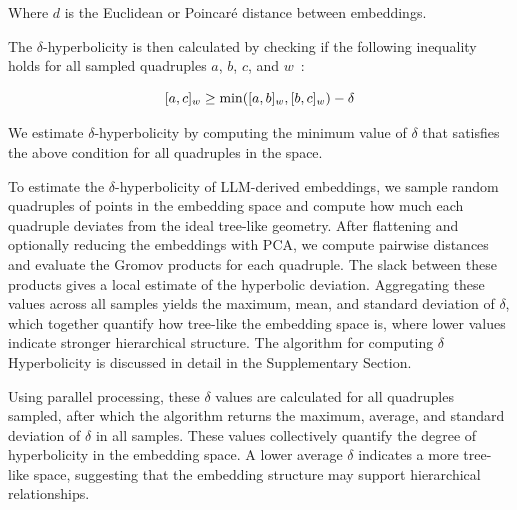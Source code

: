 \documentclass[]{Liebert_Author_revised}
\begin{document}
Where \(d\) is the Euclidean or Poincaré distance between embeddings.

The $\delta$-hyperbolicity is then calculated by checking if the following inequality holds for all sampled quadruples \(a\), \(b\), \(c\), and \(w\)~\citeauthor{yang2024enhancing}:

\begin{equation}
\label{gromov_dist_eq2}
\scriptsize
[a, c]_w \geq \min([a, b]_w, [b, c]_w) - \delta
\end{equation}

We estimate $\delta$-hyperbolicity by computing the minimum value of \(\delta\) that satisfies the above condition for all quadruples in the space.

To estimate the $\delta$-hyperbolicity of LLM-derived embeddings, we sample random quadruples of points in the embedding space and compute how much each quadruple deviates from the ideal tree-like geometry. After flattening and optionally reducing the embeddings with PCA, we compute pairwise distances and evaluate the Gromov products for each quadruple. The slack between these products gives a local estimate of the hyperbolic deviation. Aggregating these values across all samples yields the maximum, mean, and standard deviation of $\delta$, which together quantify how tree-like the embedding space is, where lower values indicate stronger hierarchical structure. The algorithm for computing $\delta$ Hyperbolicity is discussed in detail in the Supplementary Section.

Using parallel processing, these $\delta$ values are calculated for all quadruples sampled, after which the algorithm returns the maximum, average, and standard deviation of $\delta$ in all samples. These values collectively quantify the degree of hyperbolicity in the embedding space. A lower average $\delta$ indicates a more tree-like space, suggesting that the embedding structure may support hierarchical relationships.
\end{document}
